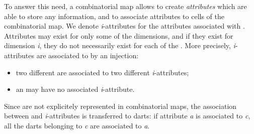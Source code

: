 To answer this need, a combinatorial map allows to create
\emph{attributes} which are able to store any information, and to
associate attributes to cells of the combinatorial map.  We denote
\emph{i}-attributes for the attributes associated with
. Attributes may exist for only some of the dimensions, and
if they exist for dimension \emph{i}, they do not necessarily exist for
each of the .  More precisely, \emph{i}-attributes are associated
to  by an injection:
\begin{itemize}
\item two different  are associated to two different
  \emph{i}-attributes;
\item an  may have no associated \emph{i}-attribute.
\end{itemize}

Since  are not explicitely represented in combinatorial maps,
the association between  and \emph{i}-attributes is transferred to
darts: if attribute \emph{a} is associated to  \emph{c}, all the darts
belonging to \emph{c} are associated to \emph{a}.


